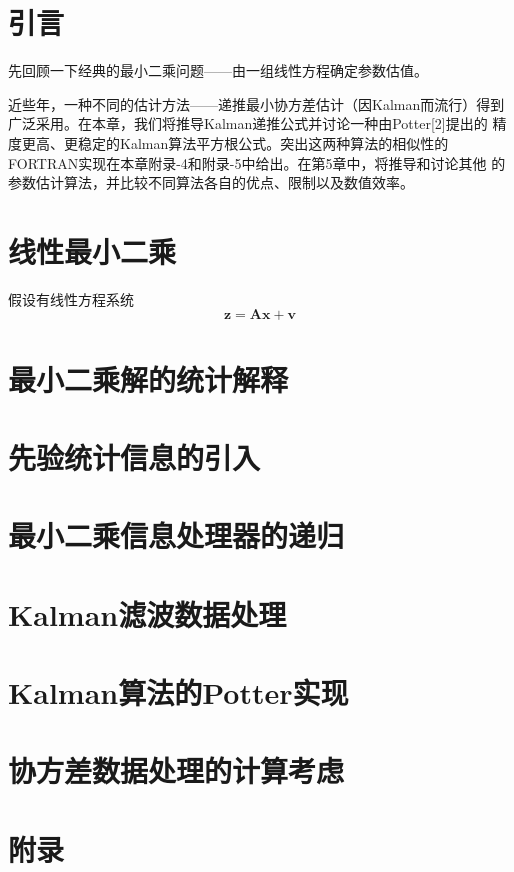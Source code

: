 \documentclass[./book.tex]{subfiles}
\begin{document}
\section{引言}
先回顾一下经典的最小二乘问题——由一组线性方程确定参数估值。

近些年，一种不同的估计方法——递推最小协方差估计（因Kalman而流行）得到广泛采用。在本章，我们将推导Kalman递推公式并讨论一种由Potter[2]提出的
精度更高、更稳定的Kalman算法平方根公式。突出这两种算法的相似性的FORTRAN实现在本章附录-4和附录-5中给出。在第5章中，将推导和讨论其他
的参数估计算法，并比较不同算法各自的优点、限制以及数值效率。

\section{线性最小二乘}

假设有线性方程系统
\begin{equation}
    \bm{z}=\bm{A}\bm{x}+\bm{v}
\end{equation}

\section{最小二乘解的统计解释}

\section{先验统计信息的引入}

\section{最小二乘信息处理器的递归}

\section{Kalman滤波数据处理}

\section{Kalman算法的Potter实现}

\section{协方差数据处理的计算考虑}

\section{附录}
\end{document}
